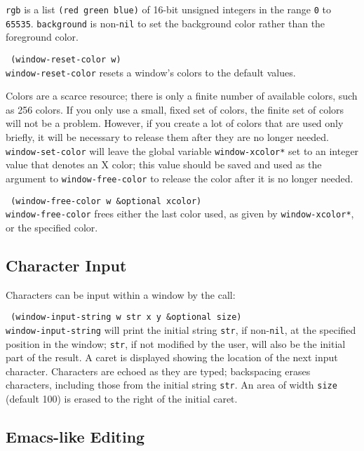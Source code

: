 {\tt rgb} is a list {\tt (red green blue)} of 16-bit unsigned integers in
the range {\tt 0} to {\tt 65535}.  {\tt background} is non-{\tt nil}
to set the background color rather than the foreground color.

{\tt \hspace*{0.5in} (window-reset-color w)} \\
{\tt window-reset-color} resets a window's colors to the default values.

Colors are a scarce resource; there is only a finite number of
available colors, such as 256 colors.  If you only use a small, fixed set
of colors, the finite set of colors will not be a problem.  However,
if you create a lot of colors that are used only briefly, it will be
necessary to release them after they are no longer needed.
{\tt window-set-color} will leave the global variable {\tt *window-xcolor*}
set to an integer value that denotes an X color; this value should be
saved and used as the argument to {\tt window-free-color} to release
the color after it is no longer needed.

{\tt \hspace*{0.5in} (window-free-color w \&optional xcolor)} \\

{\tt window-free-color} frees either the last color used, as given by
{\tt *window-xcolor*}, or the specified color.


\subsection{Character Input} \label{texted}

Characters can be input within a window by the call:

{\tt \hspace*{0.5in} (window-input-string w str x y \&optional size)} \\

{\tt window-input-string} will print the initial string {\tt str},
if non-{\tt nil},
at the specified position in the window; {\tt str}, if not modified
by the user, will also be the initial part of the result.  A caret
is displayed showing the location of the next input character.
Characters are echoed as they are typed; backspacing erases characters,
including those from the initial string {\tt str}.  An area of width
{\tt size} (default 100) is erased to the right of the initial caret.


\subsection{Emacs-like Editing} \label{emacsed}

